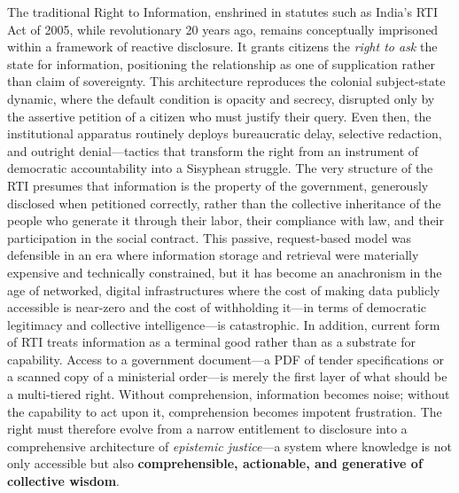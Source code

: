The traditional Right to Information, enshrined in statutes such as
India's RTI Act of 2005, while revolutionary 20 years ago, remains
conceptually imprisoned within a framework of reactive disclosure. It
grants citizens the \emph{right to ask} the state for information,
positioning the relationship as one of supplication rather than claim of
sovereignty. This architecture reproduces the colonial subject-state
dynamic, where the default condition is opacity and secrecy, disrupted
only by the assertive petition of a citizen who must justify their
query. Even then, the institutional apparatus routinely deploys
bureaucratic delay, selective redaction, and outright denial---tactics
that transform the right from an instrument of democratic accountability
into a Sisyphean struggle. The very structure of the RTI presumes that
information is the property of the government, generously disclosed when
petitioned correctly, rather than the collective inheritance of the
people who generate it through their labor, their compliance with law,
and their participation in the social contract. This passive,
request-based model was defensible in an era where information storage
and retrieval were materially expensive and technically constrained, but
it has become an anachronism in the age of networked, digital
infrastructures where the cost of making data publicly accessible is
near-zero and the cost of withholding it---in terms of democratic
legitimacy and collective intelligence---is catastrophic. In addition,
current form of RTI treats information as a terminal good rather than as
a substrate for capability. Access to a government document---a PDF of
tender specifications or a scanned copy of a ministerial order---is
merely the first layer of what should be a multi-tiered right. Without
comprehension, information becomes noise; without the capability to act
upon it, comprehension becomes impotent frustration. The right must
therefore evolve from a narrow entitlement to disclosure into a
comprehensive architecture of \emph{epistemic justice}---a system where
knowledge is not only accessible but also \textbf{comprehensible,
actionable, and generative of collective wisdom}.

